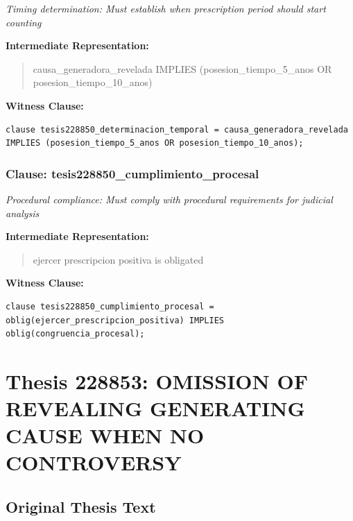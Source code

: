 \documentclass[11pt,a4paper]{article}
\begin{document}
\textit{Timing determination: Must establish when prescription period should start counting}

\textbf{Intermediate Representation:}

\begin{quote}
causa\_generadora\_revelada IMPLIES (posesion\_tiempo\_5\_anos OR posesion\_tiempo\_10\_anos)
\end{quote}

\textbf{Witness Clause:}

\begin{lstlisting}[style=witnessstyle, language=Witness]
clause tesis228850_determinacion_temporal = causa_generadora_revelada IMPLIES (posesion_tiempo_5_anos OR posesion_tiempo_10_anos);
\end{lstlisting}

\subsubsection{Clause: tesis228850\_cumplimiento\_procesal}

\textit{Procedural compliance: Must comply with procedural requirements for judicial analysis}

\textbf{Intermediate Representation:}

\begin{quote}
ejercer prescripcion positiva is obligated
\end{quote}

\textbf{Witness Clause:}

\begin{lstlisting}[style=witnessstyle, language=Witness]
clause tesis228850_cumplimiento_procesal = oblig(ejercer_prescripcion_positiva) IMPLIES oblig(congruencia_procesal);
\end{lstlisting}

\newpage

\section{Thesis 228853: OMISSION OF REVEALING GENERATING CAUSE WHEN NO CONTROVERSY}
\label{thesis:228853}

\subsection{Original Thesis Text}
\end{document}
